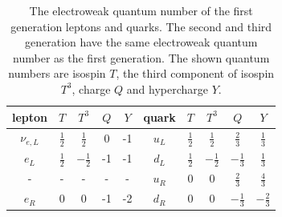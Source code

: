\begin{table}[ht]
    \centering
    \setlength{\tabcolsep}{1 em}
    \renewcommand{\arraystretch}{1.5}
    \caption{The electroweak quantum number of the first generation leptons and quarks. The second and third generation have the same electroweak quantum number as the first generation. The shown quantum numbers are isospin $T$, the third component of isospin $T^3$, charge $Q$ and hypercharge $Y$. }
    \begin{tabular}{ccccc|ccccc}
    \hline
    lepton      & $T$           & $T^3$          & $Q$ & $Y$ & quark  & $T$           & $T^3$          & $Q$            & $Y$            \\
    \hline
    $\nu_{e,L}$ & $\frac{1}{2}$ & $\frac{1}{2}$  & 0   & -1  & $u_L$  & $\frac{1}{2}$ & $\frac{1}{2}$  & $\frac{2}{3}$  & $\frac{1}{3}$  \\
    $e_L$       & $\frac{1}{2}$ & $-\frac{1}{2}$ & -1  & -1  & $d_L$  & $\frac{1}{2}$ & $-\frac{1}{2}$ & $-\frac{1}{3}$ & $\frac{1}{3}$  \\
    \hline
    -           & -             & -              & -   & -   & $u_R$  & 0             & 0              & $\frac{2}{3}$  & $\frac{4}{3}$  \\
    $e_R$       & 0             & 0              & -1  & -2  & $d_R$  & 0             & 0              & $-\frac{1}{3}$ & $-\frac{2}{3}$ \\
    \hline
    \end{tabular}
    \label{tab:relatedWorks:smParticles:ewQuantumNumber}
\end{table}


